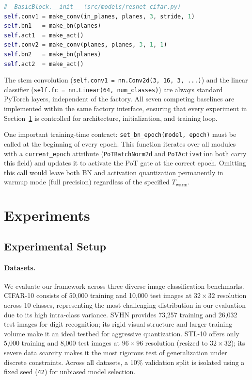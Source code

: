 \documentclass[12pt]{article}
\begin{document}
\begin{lstlisting}[language=Python]
# _BasicBlock.__init__ (src/models/resnet_cifar.py)
self.conv1 = make_conv(in_planes, planes, 3, stride, 1)
self.bn1   = make_bn(planes)
self.act1  = make_act()
self.conv2 = make_conv(planes, planes, 3, 1, 1)
self.bn2   = make_bn(planes)
self.act2  = make_act()
\end{lstlisting}

The stem convolution (\texttt{self.conv1 = nn.Conv2d(3, 16, 3, ...)}) and the linear classifier (\texttt{self.fc = nn.Linear(64, num\_classes)}) are always standard PyTorch layers, independent of the factory. All seven competing baselines are implemented within the same factory interface, ensuring that every experiment in Section~\ref{sec:experiments} is controlled for architecture, initialization, and training loop.

One important training-time contract: \texttt{set\_bn\_epoch(model, epoch)} must be called at the beginning of every epoch. This function iterates over all modules with a \texttt{current\_epoch} attribute (\texttt{PoTBatchNorm2d} and \texttt{PoTActivation} both carry this field) and updates it to activate the PoT gate at the correct epoch. Omitting this call would leave both BN and activation quantization permanently in warmup mode (full precision) regardless of the specified $T_\text{warm}$.



\section{Experiments}
\label{sec:experiments}

\subsection{Experimental Setup}

\paragraph{Datasets.} We evaluate our framework across three diverse image classification benchmarks. CIFAR-10 \cite{krizhevsky2009} consists of 50,000 training and 10,000 test images at $32\times32$ resolution across 10 classes, representing the most challenging distribution in our evaluation due to its high intra-class variance. SVHN \cite{netzer2011} provides 73,257 training and 26,032 test images for digit recognition; its rigid visual structure and larger training volume make it an ideal testbed for aggressive quantization. STL-10 \cite{coates2011} offers only 5,000 training and 8,000 test images at $96\times96$ resolution (resized to $32\times32$); its severe data scarcity makes it the most rigorous test of generalization under discrete constraints. Across all datasets, a 10\% validation split is isolated using a fixed seed (\texttt{42}) for unbiased model selection.
\end{document}
